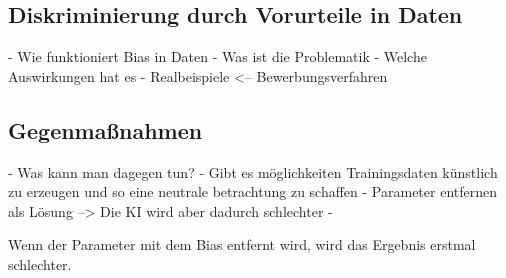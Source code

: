 \begin{onehalfspace}
    \subsection{Diskriminierung durch Vorurteile in Daten}
    \label{subsubsec:diskriminierungdurchverzerrung}

        - Wie funktioniert Bias in Daten
        - Was ist die Problematik
        - Welche Auswirkungen hat es 
        - Realbeispiele <-- Bewerbungsverfahren
        \cite{IncidentDatabase2015_16} \cite{hagendorff2019maschinelles}

    \subsection{Gegenma{\ss}nahmen}
    \label{subsubsec:gegenmassnahmen}
        - Was kann man dagegen tun?
        - Gibt es möglichkeiten Trainingsdaten künstlich zu erzeugen und so eine neutrale betrachtung zu schaffen
        - Parameter entfernen als Lösung --> Die KI wird aber dadurch schlechter 
        - 

        Wenn der Parameter mit dem Bias entfernt wird, wird das Ergebnis erstmal schlechter. 
        
    \newpage
\end{onehalfspace}